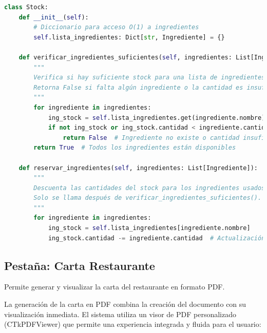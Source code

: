 \documentclass[12pt,letterpaper]{article}
\begin{document}
\begin{lstlisting}[language=Python, caption=Gestión de Stock]
class Stock:
    def __init__(self):
        # Diccionario para acceso O(1) a ingredientes
        self.lista_ingredientes: Dict[str, Ingrediente] = {}

    def verificar_ingredientes_suficientes(self, ingredientes: List[Ingrediente]) -> bool:
        """
        Verifica si hay suficiente stock para una lista de ingredientes.
        Retorna False si falta algún ingrediente o la cantidad es insuficiente.
        """
        for ingrediente in ingredientes:
            ing_stock = self.lista_ingredientes.get(ingrediente.nombre)
            if not ing_stock or ing_stock.cantidad < ingrediente.cantidad:
                return False  # Ingrediente no existe o cantidad insuficiente
        return True  # Todos los ingredientes están disponibles

    def reservar_ingredientes(self, ingredientes: List[Ingrediente]):
        """
        Descuenta las cantidades del stock para los ingredientes usados.
        Solo se llama después de verificar_ingredientes_suficientes().
        """
        for ingrediente in ingredientes:
            ing_stock = self.lista_ingredientes[ingrediente.nombre]
            ing_stock.cantidad -= ingrediente.cantidad  # Actualización atómica
\end{lstlisting}

\subsection{Pestaña: Carta Restaurante}
Permite generar y visualizar la carta del restaurante en formato PDF\@.

La generación de la carta en PDF combina la creación del documento con su visualización inmediata. El sistema utiliza un visor de PDF personalizado (CTkPDFViewer) que permite una experiencia integrada y fluida para el usuario:
\end{document}
